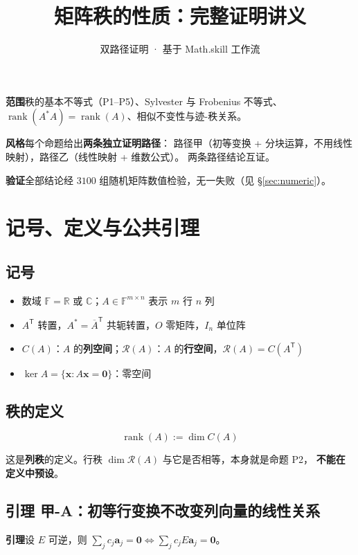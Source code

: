 \documentclass[11pt]{ctexart}
\title{\vspace{-1.2cm}\textbf{矩阵秩的性质：完整证明讲义}}
\author{双路径证明 · 基于 Math.skill 工作流}
\date{}
\newcommand{\rank}{\operatorname{rank}}
\newcommand{\F}{\mathbb{F}}
\newcommand{\C}{\mathbb{C}}
\newcommand{\R}{\mathbb{R}}
\newcommand{\T}{^{\mathsf T}}
\begin{document}
\maketitle
\vspace{-0.8cm}

\begin{keybox}
\textbf{范围}\quad 秩的基本不等式（P1--P5）、Sylvester 与 Frobenius 不等式、
$\rank(A^{*}A)=\rank(A)$、相似不变性与迹-秩关系。

\smallskip
\textbf{风格}\quad 每个命题给出\textbf{两条独立证明路径}：
路径甲（初等变换 + 分块运算，不用线性映射），路径乙（线性映射 + 维数公式）。
两条路径结论互证。

\smallskip
\textbf{验证}\quad 全部结论经 $3100$ 组随机矩阵数值检验，无一失败（见 \S\ref{sec:numeric}）。
\end{keybox}

\tableofcontents
\vspace{0.6cm}

\section{记号、定义与公共引理}

\subsection{记号}
\begin{itemize}
\item 数域 $\F=\R$ 或 $\C$；$A\in\F^{m\times n}$ 表示 $m$ 行 $n$ 列
\item $A\T$ 转置，$A^{*}=\overline{A}\T$ 共轭转置，$O$ 零矩阵，$I_n$ 单位阵
\item $C(A)$：$A$ 的\textbf{列空间}；$\mathcal R(A)$：$A$ 的\textbf{行空间}，$\mathcal R(A)=C(A\T)$
\item $\ker A=\{\mathbf x:A\mathbf x=\mathbf 0\}$：零空间
\end{itemize}

\subsection{秩的定义}
\[
\boxed{\ \rank(A):=\dim C(A)\ }
\]
\begin{warnbox}
这是\textbf{列秩}的定义。行秩 $\dim\mathcal R(A)$ 与它是否相等，本身就是命题 P2，
\textbf{不能在定义中预设}。
\end{warnbox}

\subsection{引理 甲-A：初等行变换不改变列向量的线性关系}
\textbf{引理}\quad 设 $E$ 可逆，则 $\sum_j c_j\mathbf a_j=\mathbf 0\iff\sum_j c_jE\mathbf a_j=\mathbf 0$。
\end{document}
